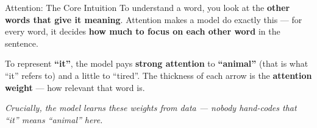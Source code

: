 \documentclass[aspectratio=169]{beamer}
\begin{document}
\begin{frame}{Attention: The Core Intuition}
\vspace{0.2cm}
{\small To understand a word, you look at the \textbf{other words that give it meaning}.
Attention makes a model do exactly this --- for every word, it decides \textbf{how much to
focus on each other word} in the sentence.}

\medskip
\begin{center}
\end{center}

\medskip
{\small To represent \textbf{``it''}, the model pays \textbf{strong attention} to
\textbf{``animal''} (that is what ``it'' refers to) and a little to ``tired''. The thickness of
each arrow is the \textbf{attention weight} --- how relevant that word is.}

\medskip
{\small\textcolor{midgray}{\textit{Crucially, the model \emph{learns} these weights from data ---
nobody hand-codes that ``it'' means ``animal'' here.}}}
\end{frame}
\end{document}
